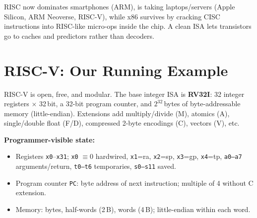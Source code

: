 \begin{center}
\end{center}

RISC now dominates smartphones (ARM), is taking laptops/servers (Apple Silicon, ARM Neoverse, RISC-V), while
x86 survives by cracking CISC instructions into RISC-like micro-ops inside the chip. A clean ISA lets
transistors go to caches and predictors rather than decoders.

\section{RISC-V: Our Running Example}
RISC-V is open, free, and modular. The base integer ISA is \textbf{RV32I}: 32 integer registers $\times$ 32\,bit,
a 32-bit program counter, and $2^{32}$\,bytes of byte-addressable memory (little-endian). Extensions add
multiply/divide (M), atomics (A), single/double float (F/D), compressed 2-byte encodings (C), vectors (V), etc.

\textbf{Programmer-visible state:}
\begin{itemize}
\item Registers \texttt{x0}--\texttt{x31}; \texttt{x0} $\equiv 0$ hardwired, \texttt{x1}=ra, \texttt{x2}=sp, \texttt{x3}=gp,
\texttt{x4}=tp, \texttt{a0--a7} arguments/return, \texttt{t0--t6} temporaries, \texttt{s0--s11} saved.
\item Program counter \texttt{PC}: byte address of next instruction; multiple of 4 without C extension.
\item Memory: bytes, half-words (2\,B), words (4\,B); little-endian within each word.
\end{itemize}

